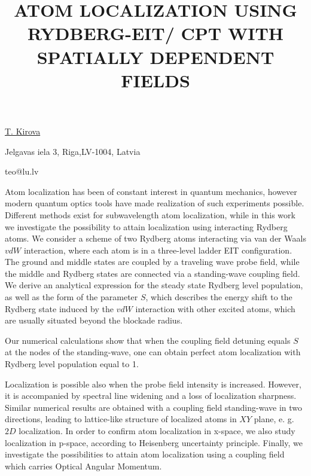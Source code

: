 \title{ATOM LOCALIZATION USING RYDBERG-EIT/ CPT WITH SPATIALLY DEPENDENT FIELDS}

\underline{T. Kirova} 

{\normalsize{\vspace{-4mm}
Jelgavas iela 3,
Riga,LV-1004, Latvia



\email teo@lu.lv}}

Atom localization has been of constant interest in quantum mechanics, however modern quantum optics tools have made realization of such experiments possible.   Different methods exist for subwavelength atom localization, while in this work we investigate the possibility to attain localization using interacting Rydberg atoms.
We consider a scheme of two Rydberg atoms interacting via van der Waals $vdW$ interaction, where each atom is in a three-level ladder EIT configuration.
The ground and middle states are coupled by a traveling wave probe field, while the middle and Rydberg states are connected via a standing-wave coupling field.
We derive an analytical expression for the steady state Rydberg level population, as well as the form of the parameter $S$, which describes the energy shift to the Rydberg state induced by the $vdW$ interaction with other excited atoms, which are usually situated beyond the blockade radius.

Our numerical calculations show that when the coupling field detuning equals $S$ at the nodes of the standing-wave, one can obtain perfect atom localization with Rydberg level population equal to 1.

Localization is possible also when the probe field intensity is increased. However, it is accompanied by spectral line widening and a loss of localization sharpness. Similar numerical results are obtained with a coupling field standing-wave in two directions, leading to lattice-like structure of localized atoms in $XY$ plane, e. g. $2D$ localization. In order to confirm atom localization in x-space, we also study localization in p-space, according to Heisenberg uncertainty principle. Finally, we investigate the possibilities to attain atom localization using a coupling field which carries Optical Angular Momentum.


\vspace{\baselineskip}